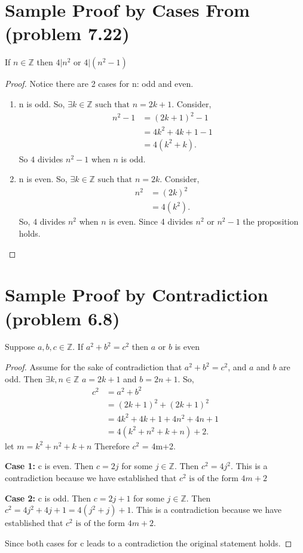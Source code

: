 \documentclass{article}
\newcommand{\Z}{\mathbb{Z}}
\newcommand{\st}{\text{ such that }}
\begin{document}
	\section*{Sample Proof by Cases From (problem 7.22)}
	If $n \in \Z$ then $4|n^2$ or $4|(n^2-1)$
	\begin{proof}
		Notice there are 2 cases for n: odd and even. 
		\begin{enumerate}[label={ Case \arabic*:}]
			\item n is odd. So, $\exists k \in \Z  \st n= 2k+1$. Consider,
			\begin{align*}
			n^2-1 &= (2k+1)^2-1\\
				&= 4k^2+ 4k +1-1\\
				&= 4(k^2+k).
			\end{align*}
			So $4$ divides $n^2-1$ when $n$ is odd. 
			\item n is even. So, $\exists k \in \Z  \st n= 2k$. Consider,
			\begin{align*}
				n^2 &= (2k)^2\\
				&= 4(k^2).
			\end{align*}
			So, $4$ divides $n^2$ when $n$ is even. Since 4 divides $n^2$ or $n^2-1$ the proposition holds.
		\end{enumerate}
	\end{proof}

	\section*{Sample Proof by Contradiction (problem 6.8)}
	Suppose $a,b,c \in \Z$. If $a^2+b^2=c^2$ then $a$ or $b$ is even
	\begin{proof}
		Assume for the sake of contradiction that $a^2+b^2=c^2$, and $a$ and $b$ are odd. Then $\exists k,n\in \Z$ \st $a=2k+1$ and $b = 2n+1$. So,
		\begin{align*}
		c^2 &= a^2 + b^2\\
		&= (2k+1)^2 + (2k+1)^2\\
		&= 4k^2 + 4k + 1 + 4n^2 + 4n + 1 \\
		&= 4(k^2+n^2 + k + n) + 2.
		\end{align*}
		let $m= k^2+n^2 + k + n$ Therefore $c^2$ = 4m+2.
		
		\textbf{Case 1:} c is even.
		Then $c= 2j$ for some $j \in \Z$. Then $c^2 = 4j^2$.
		This is a contradiction because we have established that $c^2 \text{ is of the form } 4m + 2$
		
		\textbf{Case 2:} c is odd.
		Then $c= 2j+1$ for some $j \in \Z$. Then $c^2 = 4j^2+4j+ 1 =4(j^2+j)+1$. 
		This is a contradiction because we have established that $c^2 \text{ is of the form } 4m + 2$.
		
		Since both cases for c leads to a contradiction the original statement holds. 
	\end{proof}
	
\end{document}
